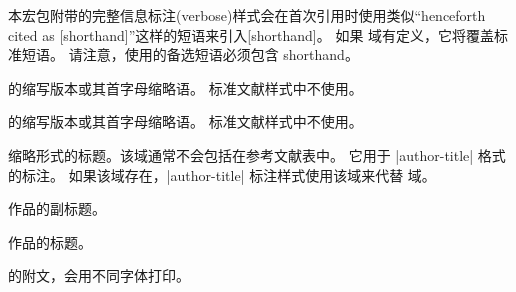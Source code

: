 \begin{fieldlist}

本宏包附带的完整信息标注(verbose)样式会在首次引用时使用类似“henceforth cited as [shorthand]”这样的短语来引入[shorthand]。
如果  域有定义，它将覆盖标准短语。
请注意，使用的备选短语必须包含 shorthand。




 的缩写版本或其首字母缩略语。
标准文献样式中不使用。




 的缩写版本或其首字母缩略语。
标准文献样式中不使用。




缩略形式的标题。该域通常不会包括在参考文献表中。
它用于 |author-title| 格式的标注。
如果该域存在，|author-title| 标注样式使用该域来代替  域。




作品的副标题。




作品的标题。




 的附文，会用不同字体打印。


\end{fieldlist}

